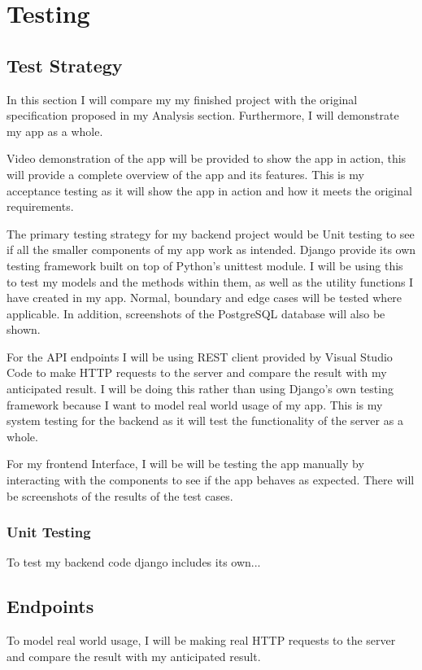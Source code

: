 \chapter{Testing}

\section{Test Strategy}
In this section I will compare my my finished project with the original specification proposed in my Analysis section. Furthermore, I will demonstrate my app as a whole.

Video demonstration of the app will be provided to show the app in action, this will provide a complete overview of the app and its features. This is my acceptance testing as it will show the app in action and how it meets the original requirements.

The primary testing strategy for my backend project would be Unit testing to see if all the smaller components of my app work as intended. Django provide its own testing framework built on top of Python's unittest module. I will be using this to test my models and the methods within them, as well as the utility functions I have created in my app. Normal, boundary and edge cases will be tested where applicable. In addition, screenshots of the PostgreSQL database will also be shown.

For the API endpoints I will be using REST client provided by Visual Studio Code to make HTTP requests to the server and compare the result with my anticipated result. I will be doing this rather than using Django's own testing framework because I want to model real world usage of my app. This is my system testing for the backend as it will test the functionality of the server as a whole.

For my frontend Interface, I will be will be testing the app manually by interacting with the components to see if the app behaves as expected. There will be screenshots of the results of the test cases. 



\subsection{Unit Testing}
To test my backend code django includes its own...

\section{Endpoints}
To model real world usage, I will be making real HTTP requests to the server and compare the result with my anticipated result.



